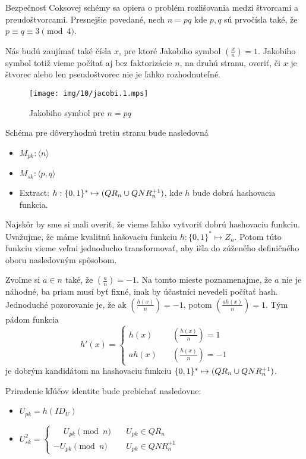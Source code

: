 Bezpečnosť Coksovej schémy \cite{cocks} sa opiera o problém rozlišovania medzi
štvorcami a preudoštvorcami. Presnejšie povedané,
nech $n=pq$ kde $p,q$ sú prvočísla také, že $p \equiv q \equiv 3 \pmod{4}$.

\def\jacobi#1#2{\left( \frac{#1}{#2} \right)}

Nás budú zaujímať také čísla $x$, pre ktoré Jakobiho symbol
$\jacobi{x}{n} =1$. Jakobiho symbol totiž vieme počítať aj bez
faktorizácie $n$, na druhú stranu, overiť, či $x$ je štvorec alebo len
pseudoštvorec nie je ľahko rozhodnuteľné.

\begin{figure}[h]
    \centering
    \texttt{[image: img/10/jacobi.1.mps]}
    \caption{Jakobiho symbol pre $n=pq$}
    \label{fig:jacobi}
\end{figure}


Schéma pre dôveryhodnú tretiu stranu bude nasledovná
\begin{itemize}
    \item $M_{pk}: \langle n \rangle$
    \item $M_{sk}: \langle p,q \rangle$
    \item Extract: $h: \{0,1\}^* \mapsto (QR_n \cup QNR_n^{+1})$,
    kde $h$ bude dobrá hashovacia funkcia.
\end{itemize}

Najskôr by sme si mali overiť, že vieme ľahko vytvoriť dobrú
hashovaciu funkciu. Uvažujme, že máme kvalitnú hašovaciu funkciu
$h:\{0,1\}^* \mapsto Z_n$.
Potom túto funkciu vieme veľmi jednoducho transformovať, aby išla do
zúženého definičného oboru nasledovným spôsobom.

Zvoľme si $a \in n$ také, že $\jacobi{a}{n} = -1$. Na tomto mieste
poznamenajme, že $a$ nie je náhodné, ba priam musí byť fixné, inak by
účastníci nevedeli počítať hash.
Jednoduché pozorovanie je, že ak $\jacobi{h(x)}{n}=-1$,
potom $\jacobi{a h(x)}{n}=1$.
Tým pádom funkcia
\begin{equation*}
h'(x) = \begin{cases}
            h(x)   \quad &\jacobi{h(x)}{n}=1 \\
            a h(x) \quad &\jacobi{h(x)}{n}=-1
        \end{cases}
\end{equation*}
je dobrým kandidátom na hashovaciu funkciu
$\{0,1\}^* \mapsto (QR_n \cup QNR_n^{+1})$.

Priradenie kľúčov identite bude prebiehať nasledovne:
\begin{itemize}
    \item $U_{pk}=h(ID_U)$

    \item $U_{sk}^2=\begin{cases}
            \phantom{-} U_{pk}\pmod{n}  \quad& U_{pk} \in QR_n \\
                     -  U_{pk}\pmod{n}  \quad& U_{pk} \in QNR_n^{+1}
                    \end{cases}$
\end{itemize}

